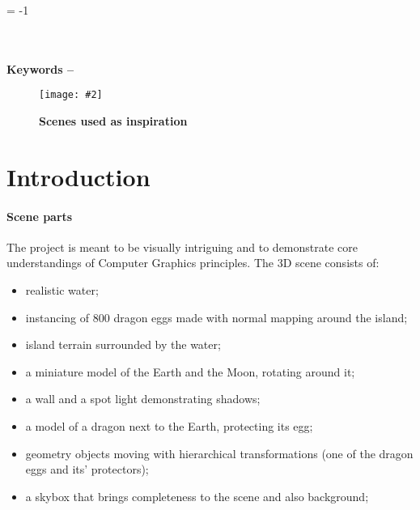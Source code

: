 \documentclass[10pt, a4paper]{article}
\title{\mytitle}
\author{\myauthor\hspace{1em}\\\contact\\Edinburgh Napier University\hspace{0.5em}-\hspace{0.5em}\mymodule}
\date{}
\newcommand{\figuremacro}[5]{
    \begin{figure}[#1]
        \centering
        \texttt{[image: \#2]}
        \caption[#3]{\textbf{#3}#4}
        \label{fig:#2}
    \end{figure}
}
\begin{document}
	
	
	\hyphenchar\font = -1
	
	\maketitle
	\begin{abstract}
		 The aim of this project is to create a realistic 3D scene, rendered in real-time. The project is inspired by the series \textit{Games of Thrones}\cite{dragons} (see \textbf{Figure {\ref{fig:inspiration}}}) and previous years projects found on the games website\cite{gamesWebsite} of Napier University. A wide variety of graphics techniques were used to create the 3D scene, from material shading and post-processing effects to reflective and refractive rippling water. This report covers how the scene was implemented and what future work is considered.
	\end{abstract}
	\\\\
	\textbf{Keywords -- }{\mykeywords}
	\figuremacro{h}{inspiration}{Scenes used as inspiration}{ }{1.0}	
    
	\section{Introduction}
    \paragraph{Scene parts} The project is meant to be visually intriguing and to demonstrate core understandings of Computer Graphics principles. The 3D scene consists of:   
    \begin{itemize}
    	\item realistic water;
    	\item instancing of 800 dragon eggs made with normal mapping around the island;
    	\item island terrain surrounded by the water;   
    	\item a miniature model of the Earth and the Moon, rotating around it;
    	\item a wall and a spot light demonstrating shadows;
    	\item a model of a dragon next to the Earth, protecting its egg;
    	\item geometry objects moving with hierarchical transformations (one of the dragon eggs and its' protectors);
    	\item a skybox that brings completeness to the scene and also background;	
    \end{itemize}
    
\end{document}
